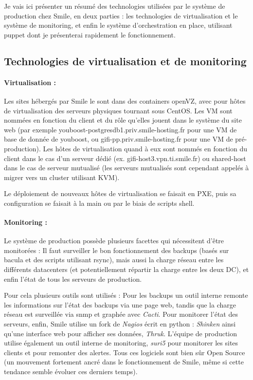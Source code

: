\documentclass[14 pt]{extreport}
\begin{document}
Je vais ici présenter un résumé des technologies utilisées par le système de production chez Smile, en deux parties : les technologies de virtualisation et le système de monitoring, et enfin le système d'orchestration en place, utilisant puppet dont je présenterai rapidement le fonctionnement.
\subsection{Technologies de virtualisation et de monitoring}
\paragraph{Virtualisation :}Les sites hébergés par Smile le sont dans des containers openVZ, avec pour hôtes de virtualisation des serveurs physiques tournant sous CentOS. Les VM sont nommées en fonction du client et du rôle qu'elles jouent dans le système du site web (par exemple youboost-postgresdb1.priv.smile-hosting.fr pour une VM de base de donnée de youboost, ou gifi-pp.priv.smile-hosting.fr pour une VM de pré-production). Les hôtes de virtualisation quand à eux sont nommés en fonction du client dans le cas d'un serveur dédié (ex. gifi-host3.vpn.ti.smile.fr) ou shared-host dans le cas de serveur mutualisé (les serveurs mutualisés sont cependant appelés à migrer vers un cluster utilisant KVM).

Le déploiement de nouveaux hôtes de virtualisation se faisait en PXE, puis sa configuration se faisait à la main ou par le biais de scripts shell.


\paragraph{Monitoring :}Le système de production possède plusieurs facettes qui nécessitent d'être monitorées : Il faut surveiller le bon fonctionnement des backups (basés sur bacula et des scripts utilisant rsync), mais aussi la charge réseau entre les différents datacenters (et potentiellement répartir la charge entre les deux DC), et enfin l'état de tous les serveurs de production.

Pour cela plusieurs outils sont utilisés : Pour les backups un outil interne remonte les informations sur l'état des backups via une page web, tandis que la charge réseau est surveillée via snmp et graphée avec \emph{Cacti}. Pour monitorer l'état des serveurs, enfin, Smile utilise un fork de \emph{Nagios} écrit en python : \emph{Shinken} ainsi qu'une interface web pour afficher ses données, \emph{Thruk}. L'équipe de production utilise également un outil interne de monitoring, \emph{suri5} pour monitorer les sites clients et pour remonter des alertes. Tous ces logiciels sont bien sûr Open Source (un mouvement fortement ancré dans le fonctionnement de Smile, même si cette tendance semble évoluer ces derniers temps).
\end{document}
